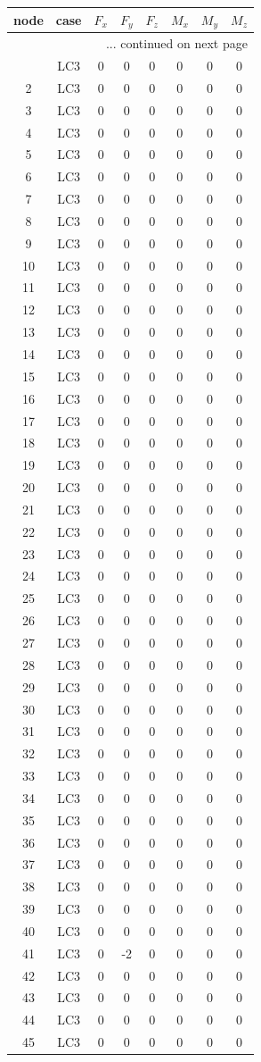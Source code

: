 \documentclass{article}%
\begin{document}
\begin{longtable}{| c c | c c c c c c |}%
\hline%
node&case&$F_x$&$F_y$&$F_z$&$M_x$&$M_y$&$M_z$\\%
\hline%
\endhead%
\hline%
\multicolumn{8}{r}{... continued on next page}\\%
\endfoot%
\hline%
\endlastfoot%
1&LC3&0&0&0&0&0&0\\%
2&LC3&0&0&0&0&0&0\\%
3&LC3&0&0&0&0&0&0\\%
4&LC3&0&0&0&0&0&0\\%
5&LC3&0&0&0&0&0&0\\%
6&LC3&0&0&0&0&0&0\\%
7&LC3&0&0&0&0&0&0\\%
8&LC3&0&0&0&0&0&0\\%
9&LC3&0&0&0&0&0&0\\%
10&LC3&0&0&0&0&0&0\\%
11&LC3&0&0&0&0&0&0\\%
12&LC3&0&0&0&0&0&0\\%
13&LC3&0&0&0&0&0&0\\%
14&LC3&0&0&0&0&0&0\\%
15&LC3&0&0&0&0&0&0\\%
16&LC3&0&0&0&0&0&0\\%
17&LC3&0&0&0&0&0&0\\%
18&LC3&0&0&0&0&0&0\\%
19&LC3&0&0&0&0&0&0\\%
20&LC3&0&0&0&0&0&0\\%
21&LC3&0&0&0&0&0&0\\%
22&LC3&0&0&0&0&0&0\\%
23&LC3&0&0&0&0&0&0\\%
24&LC3&0&0&0&0&0&0\\%
25&LC3&0&0&0&0&0&0\\%
26&LC3&0&0&0&0&0&0\\%
27&LC3&0&0&0&0&0&0\\%
28&LC3&0&0&0&0&0&0\\%
29&LC3&0&0&0&0&0&0\\%
30&LC3&0&0&0&0&0&0\\%
31&LC3&0&0&0&0&0&0\\%
32&LC3&0&0&0&0&0&0\\%
33&LC3&0&0&0&0&0&0\\%
34&LC3&0&0&0&0&0&0\\%
35&LC3&0&0&0&0&0&0\\%
36&LC3&0&0&0&0&0&0\\%
37&LC3&0&0&0&0&0&0\\%
38&LC3&0&0&0&0&0&0\\%
39&LC3&0&0&0&0&0&0\\%
40&LC3&0&0&0&0&0&0\\%
41&LC3&0&{-}2&0&0&0&0\\%
42&LC3&0&0&0&0&0&0\\%
43&LC3&0&0&0&0&0&0\\%
44&LC3&0&0&0&0&0&0\\%
45&LC3&0&0&0&0&0&0\\%
\end{longtable}
\end{document}
